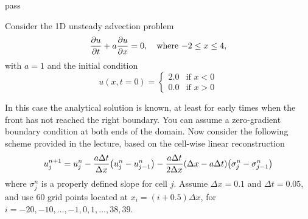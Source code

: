 pass



\begin{homework}[label={H:6-2}]
    Consider the 1D unsteady advection problem
    \begin{equation}\label{E:6-2-1}
        \pdv{u}{t} + a\pdv{u}{x}=0,
        \quad
        \text{where $-2\leq x\leq 4$},
    \end{equation}
    with $a=1$ and the initial condition
    \begin{equation}\label{E:6-2-2}
        u(x, t=0) = \begin{cases}
            2.0 & \text{if $x<0$} \\
            0.0 & \text{if $x>0$}
        \end{cases}
    \end{equation}

    In this case the analytical solution is known, at least for early times when the front has not reached the right boundary. You can assume a zero-gradient boundary condition at both ends of the domain. Now consider the following scheme provided in the lecture, based on the cell-wise linear reconstruction
    \begin{equation}\label{E:6-2-3}
        u^{n+1}_j = u^n_j - \frac{a\Delta t}{\Delta x}\qty(u^n_j-u^n_{j-1}) - \frac{a\Delta t}{2\Delta x}\qty(\Delta x-a\Delta t)\qty(\sigma^n_j-\sigma^n_{j-1})
    \end{equation}
    where $\sigma^n_j$ is a properly defined slope for cell $j$. Assume $\Delta x=0.1$ and $\Delta t=0.05$, and use 60 grid points located at $x_i=(i+0.5)\Delta x$, for $i=-20, -10, \ldots, -1, 0, 1, \ldots, 38, 39$.


\end{homework}
